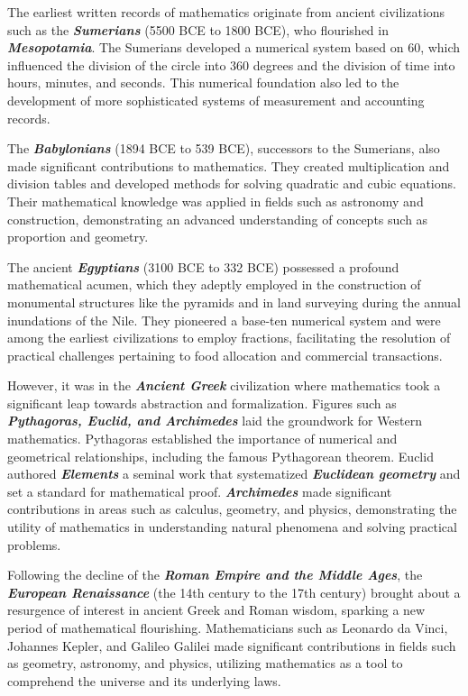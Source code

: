 The earliest written records of mathematics originate from ancient civilizations such as the \textbf{\textit{Sumerians}} (5500 BCE to 1800 BCE), who flourished in \textbf{\textit{Mesopotamia}}. The Sumerians developed a numerical system based on 60, which influenced the division of the circle into 360 degrees and the division of time into hours, minutes, and seconds. This numerical foundation also led to the development of more sophisticated systems of measurement and accounting records.

The \textbf{\textit{Babylonians}} (1894 BCE to 539 BCE), successors to the Sumerians, also made significant contributions to mathematics. They created multiplication and division tables and developed methods for solving quadratic and cubic equations. Their mathematical knowledge was applied in fields such as astronomy and construction, demonstrating an advanced understanding of concepts such as proportion and geometry.

The ancient \textbf{\textit{Egyptians}} (3100 BCE to 332 BCE) possessed a profound mathematical acumen, which they adeptly employed in the construction of monumental structures like the pyramids and in land surveying during the annual inundations of the Nile. They pioneered a base-ten numerical system and were among the earliest civilizations to employ fractions, facilitating the resolution of practical challenges pertaining to food allocation and commercial transactions.

However, it was in the \textbf{\textit{Ancient Greek}} civilization where mathematics took a significant leap towards abstraction and formalization. Figures such as \textbf{\textit{Pythagoras, Euclid, and Archimedes}} laid the groundwork for Western mathematics. Pythagoras established the importance of numerical and geometrical relationships, including the famous Pythagorean theorem. Euclid authored \textbf{\textit{Elements}} a seminal work that systematized \textbf{\textit{Euclidean geometry}} and set a standard for mathematical proof. \textbf{\textit{Archimedes}} made significant contributions in areas such as calculus, geometry, and physics, demonstrating the utility of mathematics in understanding natural phenomena and solving practical problems.

Following the decline of the \textbf{\textit{Roman Empire and the Middle Ages}}, the \textbf{\textit{European Renaissance}} (the 14th century to the 17th century) brought about a resurgence of interest in ancient Greek and Roman wisdom, sparking a new period of mathematical flourishing. Mathematicians such as Leonardo da Vinci, Johannes Kepler, and Galileo Galilei made significant contributions in fields such as geometry, astronomy, and physics, utilizing mathematics as a tool to comprehend the universe and its underlying laws.

